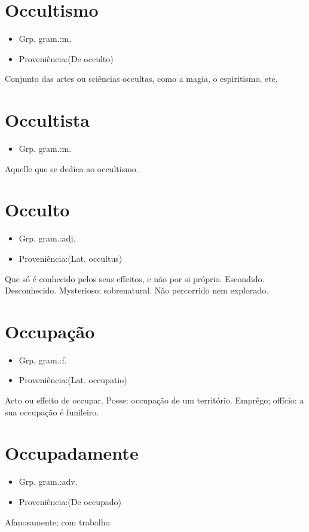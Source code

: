 \section{Occultismo}
\begin{itemize}
\item {Grp. gram.:m.}
\end{itemize}
\begin{itemize}
\item {Proveniência:(De \textunderscore occulto\textunderscore )}
\end{itemize}
Conjunto das artes ou sciências occultas, como a magia, o espiritismo, etc.
\section{Occultista}
\begin{itemize}
\item {Grp. gram.:m.}
\end{itemize}
Aquelle que se dedica ao occultismo.
\section{Occulto}
\begin{itemize}
\item {Grp. gram.:adj.}
\end{itemize}
\begin{itemize}
\item {Proveniência:(Lat. \textunderscore occultus\textunderscore )}
\end{itemize}
Que só é conhecido pelos seus effeitos, e não por si próprio.
Escondido.
Desconhecido.
Mysterioso; sobrenatural.
Não percorrido nem explorado.
\section{Occupação}
\begin{itemize}
\item {Grp. gram.:f.}
\end{itemize}
\begin{itemize}
\item {Proveniência:(Lat. \textunderscore occupatio\textunderscore )}
\end{itemize}
Acto ou effeito de occupar.
Posse: \textunderscore occupação de um território\textunderscore .
Emprêgo; offício: \textunderscore a sua occupação é funileiro\textunderscore .
\section{Occupadamente}
\begin{itemize}
\item {Grp. gram.:adv.}
\end{itemize}
\begin{itemize}
\item {Proveniência:(De \textunderscore occupado\textunderscore )}
\end{itemize}
Afanosamente; com trabalho.
